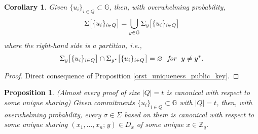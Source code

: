\documentclass[10pt, psamsfonts, reqno]{amsart}
\newtheorem{cor}[thm]{Corollary}
\newtheorem{prop}[thm]{Proposition}
\theoremstyle{definition}
\theoremstyle{remark}
\numberwithin{equation}{section}
\begin{document}
\begin{cor}\label{orst_validity_classes_prop}
Given $\{u_i\}_{i \in Q} \subset \mathbb{G}$,
then, with overwhelming probability,
\vspace{5pt}
\begin{equation}\label{orst_validity_classes_union}
\Sigma\big[\{u_i\}_{i \in Q}\big]
=
\bigcup_{y \in \mathbb{G}} \Sigma_y\big[\{u_i\}_{i \in Q}\big]
\vspace{3pt}
\end{equation}
where the right-hand side is a partition, i.e.,
\vspace{7pt}
\begin{equation*}
\Sigma_y\big[\{u_i\}_{i \in Q}\big]
\cap
\Sigma_{y^*}\big[\{u_i\}_{i \in Q}\big]
= \varnothing
\ \textit{ for }\ y \neq y^*.
\vspace{7pt}
\end{equation*}
\end{cor}

\begin{proof}
Direct consequence of Proposition \ref{orst_uniqueness_public_key}.
\end{proof}

\begin{prop}\label{orst_uniqueness_sharing}
\textup{(\textit{Almost every proof of size $|Q| = t$
is canonical with respect to some unique sharing})}
Given commitments
$\{u_i\}_{i \in Q} \subset \mathbb{G}$ with $|Q| = t$,
then, with overwhelming probability,
every $\sigma \in \Sigma$ based on them
is canonical with respect to some unique sharing
$(x_1, \dots, x_n;\hspace{1pt} y) \in D_x$
of some unique $x \in \mathbb{Z}_q$.
\end{prop}
\end{document}
